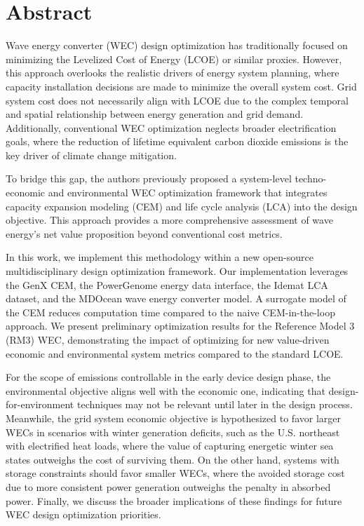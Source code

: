 \documentclass[10pt,twoside]{article}
\begin{document}
\section*{Abstract}
Wave energy converter (WEC) design optimization has traditionally focused on minimizing the Levelized Cost of Energy (LCOE) or similar proxies. However, this approach overlooks the realistic drivers of energy system planning, where capacity installation decisions are made to minimize the overall system cost. Grid system cost does not necessarily align with LCOE due to the complex temporal and spatial relationship between energy generation and grid demand. Additionally, conventional WEC optimization neglects broader electrification goals, where the reduction of lifetime equivalent carbon dioxide emissions is the key driver of climate change mitigation.

To bridge this gap, the authors previously proposed a system-level techno-economic and environmental WEC optimization framework that integrates capacity expansion modeling (CEM) and life cycle analysis (LCA) into the design objective. This approach provides a more comprehensive assessment of wave energy’s net value proposition beyond conventional cost metrics.

In this work, we implement this methodology within a new open-source multidisciplinary design optimization framework. Our implementation leverages the GenX CEM, the PowerGenome energy data interface, the Idemat LCA dataset, and the MDOcean wave energy converter model. A surrogate model of the CEM reduces computation time compared to the naive CEM-in-the-loop approach. We present preliminary optimization results for the Reference Model 3 (RM3) WEC, demonstrating the impact of optimizing for new value-driven economic and environmental system metrics compared to the standard LCOE.

For the scope of emissions controllable in the early device design phase, the environmental objective aligns well with the economic one, indicating that design-for-environment techniques may not be relevant until later in the design process. Meanwhile, the grid system economic objective is hypothesized to favor larger WECs in scenarios with winter generation deficits, such as the U.S. northeast with electrified heat loads, where the value of capturing energetic winter sea states outweighs the cost of surviving them. On the other hand, systems with storage constraints should favor smaller WECs, where the avoided storage cost due to more consistent power generation outweighs the penalty in absorbed power. Finally, we discuss the broader implications of these findings for future WEC design optimization priorities.
 \hfill 
\end{document}
